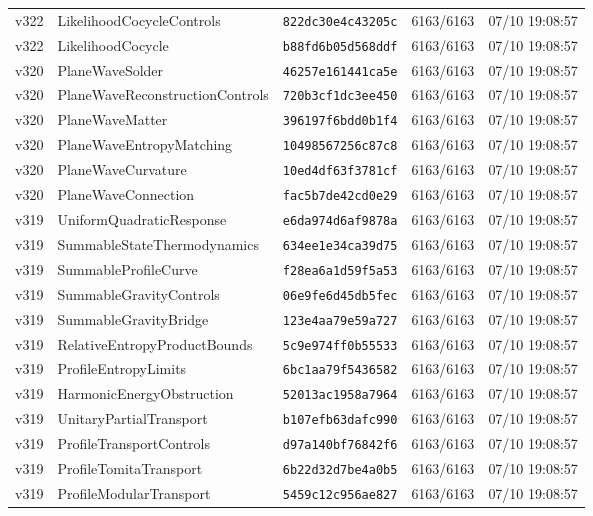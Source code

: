 \documentclass[11pt]{article}
\theoremstyle{definition}\newtheorem{deriv}{Derivação}
\begin{document}
{\begin{longtable}{@{}lllll@{}}
v322 & LikelihoodCocycleControls & \texttt{822dc30e4c43205c} & 6163/6163 & 07/10 19:08:57 \\
v322 & LikelihoodCocycle & \texttt{b88fd6b05d568ddf} & 6163/6163 & 07/10 19:08:57 \\
v320 & PlaneWaveSolder & \texttt{46257e161441ca5e} & 6163/6163 & 07/10 19:08:57 \\
v320 & PlaneWaveReconstructionControls & \texttt{720b3cf1dc3ee450} & 6163/6163 & 07/10 19:08:57 \\
v320 & PlaneWaveMatter & \texttt{396197f6bdd0b1f4} & 6163/6163 & 07/10 19:08:57 \\
v320 & PlaneWaveEntropyMatching & \texttt{10498567256c87c8} & 6163/6163 & 07/10 19:08:57 \\
v320 & PlaneWaveCurvature & \texttt{10ed4df63f3781cf} & 6163/6163 & 07/10 19:08:57 \\
v320 & PlaneWaveConnection & \texttt{fac5b7de42cd0e29} & 6163/6163 & 07/10 19:08:57 \\
v319 & UniformQuadraticResponse & \texttt{e6da974d6af9878a} & 6163/6163 & 07/10 19:08:57 \\
v319 & SummableStateThermodynamics & \texttt{634ee1e34ca39d75} & 6163/6163 & 07/10 19:08:57 \\
v319 & SummableProfileCurve & \texttt{f28ea6a1d59f5a53} & 6163/6163 & 07/10 19:08:57 \\
v319 & SummableGravityControls & \texttt{06e9fe6d45db5fec} & 6163/6163 & 07/10 19:08:57 \\
v319 & SummableGravityBridge & \texttt{123e4aa79e59a727} & 6163/6163 & 07/10 19:08:57 \\
v319 & RelativeEntropyProductBounds & \texttt{5c9e974ff0b55533} & 6163/6163 & 07/10 19:08:57 \\
v319 & ProfileEntropyLimits & \texttt{6bc1aa79f5436582} & 6163/6163 & 07/10 19:08:57 \\
v319 & HarmonicEnergyObstruction & \texttt{52013ac1958a7964} & 6163/6163 & 07/10 19:08:57 \\
v319 & UnitaryPartialTransport & \texttt{b107efb63dafc990} & 6163/6163 & 07/10 19:08:57 \\
v319 & ProfileTransportControls & \texttt{d97a140bf76842f6} & 6163/6163 & 07/10 19:08:57 \\
v319 & ProfileTomitaTransport & \texttt{6b22d32d7be4a0b5} & 6163/6163 & 07/10 19:08:57 \\
v319 & ProfileModularTransport & \texttt{5459c12c956ae827} & 6163/6163 & 07/10 19:08:57 \\

\end{longtable}}
\end{document}

